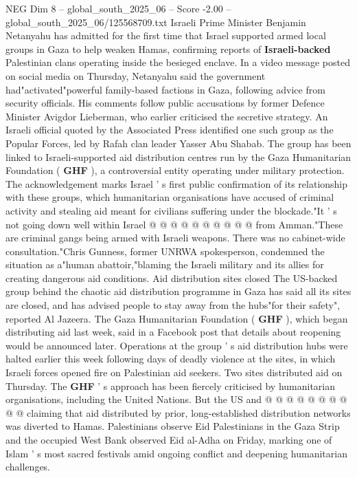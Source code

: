 \begin{textsample}{NEG Dim 8 – global\_south\_2025\_06 – Score -2.00 – global\_south\_2025\_06/125568709.txt}  \label{ex:f8_neg_039}
Israeli Prime Minister Benjamin Netanyahu has admitted for the first time that Israel supported armed local groups in Gaza to help weaken Hamas, confirming reports of \textbf{Israeli-backed} Palestinian clans operating inside the besieged enclave.
In a video message posted on social media on Thursday, Netanyahu said the government had"activated"powerful family-based factions in Gaza, following advice from security officials.
His comments follow public accusations by former Defence Minister Avigdor Lieberman, who earlier criticised the secretive strategy.
An Israeli official quoted by the Associated Press identified one such group as the Popular Forces, led by Rafah clan leader Yasser Abu Shabab.
The group has been linked to Israeli-supported aid distribution centres run by the Gaza Humanitarian Foundation ( \textbf{GHF} ), a controversial entity operating under military protection.
The acknowledgement marks Israel ' s first public confirmation of its relationship with these groups, which humanitarian organisations have accused of criminal activity and stealing aid meant for civilians suffering under the blockade."It ' s not going down well within Israel @ @ @ @ @ @ @ @ @ @ from Amman."These are criminal gangs being armed with Israeli weapons.
There was no cabinet-wide consultation."Chris Gunness, former UNRWA spokesperson, condemned the situation as a"human abattoir,"blaming the Israeli military and its allies for creating dangerous aid conditions.
Aid distribution sites closed The US-backed group behind the chaotic aid distribution programme in Gaza has said all its sites are closed, and has advised people to stay away from the hubs"for their safety", reported Al Jazeera.
The Gaza Humanitarian Foundation ( \textbf{GHF} ), which began distributing aid last week, said in a Facebook post that details about reopening would be announced later.
Operations at the group ' s aid distribution hubs were halted earlier this week following days of deadly violence at the sites, in which Israeli forces opened fire on Palestinian aid seekers.
Two sites distributed aid on Thursday.
The \textbf{GHF} ' s approach has been fiercely criticised by humanitarian organisations, including the United Nations.
But the US and @ @ @ @ @ @ @ @ @ @ claiming that aid distributed by prior, long-established distribution networks was diverted to Hamas.
Palestinians observe Eid Palestinians in the Gaza Strip and the occupied West Bank observed Eid al-Adha on Friday, marking one of Islam ' s most sacred festivals amid ongoing conflict and deepening humanitarian challenges.

\end{textsample}

